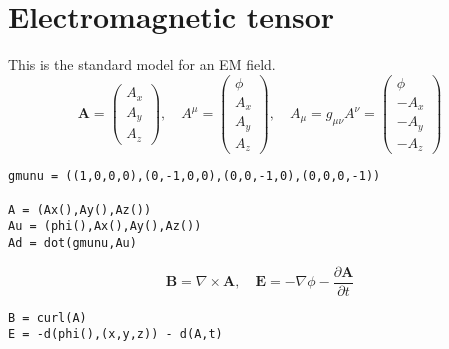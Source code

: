 \documentclass[12pt]{article}
\begin{document}
\section*{Electromagnetic tensor}

This is the standard model for an EM field.
\begin{equation*}
\mathbf A=\begin{pmatrix}A_x\\A_y\\A_z\end{pmatrix},\quad
A^\mu=\begin{pmatrix}\phi\\A_x\\A_y\\A_z\end{pmatrix},\quad
A_\mu=g_{\mu\nu}A^\nu=\begin{pmatrix}\phi\\-A_x\\-A_y\\-A_z\end{pmatrix}
\end{equation*}
{\footnotesize
\begin{verbatim}
gmunu = ((1,0,0,0),(0,-1,0,0),(0,0,-1,0),(0,0,0,-1))

A = (Ax(),Ay(),Az())
Au = (phi(),Ax(),Ay(),Az())
Ad = dot(gmunu,Au)
\end{verbatim}
}

\begin{equation*}
\mathbf B=\nabla\times\mathbf A,\quad
\mathbf E=-\nabla\phi-\frac{\partial\mathbf A}{\partial t}
\end{equation*}
{\footnotesize
\begin{verbatim}
B = curl(A)
E = -d(phi(),(x,y,z)) - d(A,t)
\end{verbatim}
}
\end{document}
